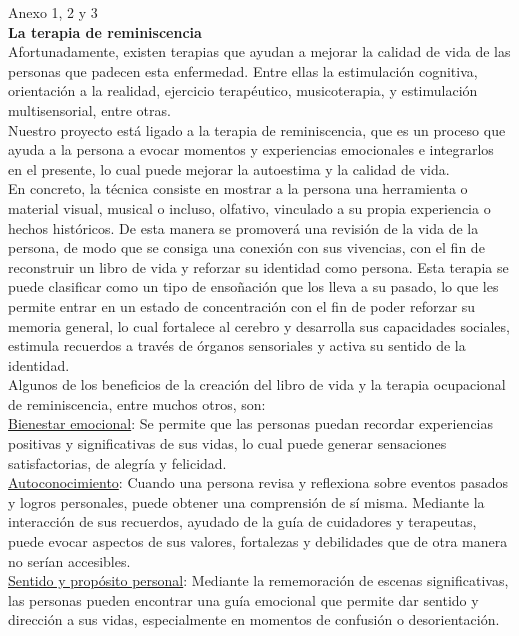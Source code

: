 {Anexo 1, 2 y 3}\\

\textbf{La terapia de reminiscencia}\\

Afortunadamente, existen terapias que ayudan a mejorar la calidad de vida de las personas que padecen esta enfermedad. Entre ellas la estimulación cognitiva, orientación a la realidad, ejercicio terapéutico, musicoterapia, y estimulación multisensorial, entre otras.\\
Nuestro proyecto está ligado a la terapia de reminiscencia, que es un proceso que ayuda a la persona a evocar momentos y experiencias emocionales e integrarlos en el presente, lo cual puede mejorar la autoestima y la calidad de vida.\\

En concreto, la técnica consiste en mostrar a la persona una herramienta o material visual, musical o incluso, olfativo, vinculado a su propia experiencia o hechos históricos. De esta manera se promoverá una revisión de la vida de la persona, de modo que se consiga una conexión con sus vivencias, con el fin de reconstruir un libro de vida y reforzar su identidad como persona.  Esta terapia se puede clasificar como un tipo de ensoñación que los lleva a su pasado, lo que les permite entrar en un estado de concentración con el fin de poder reforzar su memoria general, lo cual fortalece al cerebro y desarrolla sus capacidades sociales, estimula recuerdos a través de órganos sensoriales y activa su sentido de la identidad.\\

Algunos de los beneficios de la creación del libro de vida y la terapia ocupacional de reminiscencia, entre muchos otros, son:\\

\underline{Bienestar emocional}: Se permite que las personas puedan recordar experiencias positivas y significativas de sus vidas, lo cual puede generar sensaciones satisfactorias, de alegría y felicidad.\\

\underline{Autoconocimiento}: Cuando una persona revisa y reflexiona sobre eventos pasados y logros personales, puede obtener una comprensión de sí misma. Mediante la interacción de sus recuerdos, ayudado de la guía de cuidadores y terapeutas, puede evocar aspectos de sus valores, fortalezas y debilidades que de otra manera no serían accesibles.\\

\underline{Sentido y propósito personal}: Mediante la rememoración de escenas significativas, las personas pueden encontrar una guía emocional que permite dar sentido y dirección a sus vidas, especialmente en momentos de confusión o desorientación.\\

